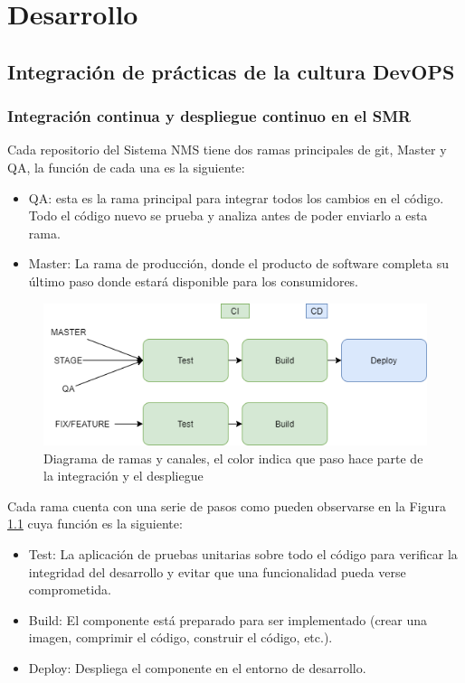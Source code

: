 \chapter{Desarrollo}
\section{Integración de prácticas de la cultura DevOPS}
\subsection{Integración continua y despliegue continuo en el SMR}

Cada repositorio del Sistema NMS tiene dos ramas principales de git, Master y QA, la función de cada una es la siguiente:

\begin {itemize}
\item QA: esta es la rama principal para integrar todos los cambios en el código. Todo el código nuevo se prueba y analiza antes de poder enviarlo a esta rama.
\item Master: La rama de producción, donde el producto de software completa su último paso donde estará disponible para los consumidores.
\end {itemize}

\begin{figure}[H]
	\centering
	\includegraphics[width=\linewidth]{bibliografia/Imagenes/ci_cd branch Diagram.png}
	\caption{Diagrama de ramas y canales, el color indica que paso hace parte de la integración y el despliegue}
	\label{pipelines}
\end{figure}

Cada rama cuenta con  una serie de pasos como pueden observarse en la Figura \ref{pipelines} cuya función es la siguiente:
\begin{itemize}
\item Test: La aplicación de pruebas unitarias sobre todo el código para verificar la integridad del desarrollo y evitar que una funcionalidad pueda verse comprometida.
\item Build: El componente está preparado para ser implementado (crear una imagen, comprimir el código, construir el código, etc.).
\item Deploy: Despliega el componente en el entorno de desarrollo.
\end{itemize}


